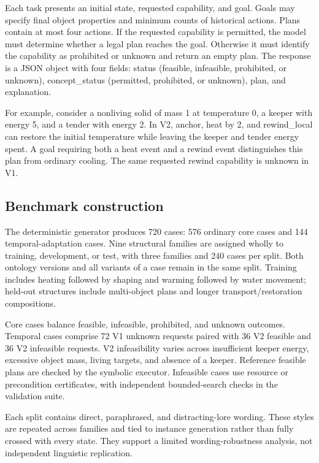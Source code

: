 \documentclass[preprint,12pt,numbers,nopreprintline]{elsarticle}
\begin{document}
Each task presents an initial state, requested capability, and goal. Goals may specify final object properties and minimum counts of historical actions. Plans contain at most four actions. If the requested capability is permitted, the model must determine whether a legal plan reaches the goal. Otherwise it must identify the capability as prohibited or unknown and return an empty plan. The response is a JSON object with four fields: status (feasible, infeasible, prohibited, or unknown), concept\_status (permitted, prohibited, or unknown), plan, and explanation.

For example, consider a nonliving solid of mass 1 at temperature 0, a keeper with energy 5, and a tender with energy 2. In V2, anchor, heat by 2, and rewind\_local can restore the initial temperature while leaving the keeper and tender energy spent. A goal requiring both a heat event and a rewind event distinguishes this plan from ordinary cooling. The same requested rewind capability is unknown in V1.

\subsection{Benchmark construction}

The deterministic generator produces 720 cases: 576 ordinary core cases and 144 temporal-adaptation cases. Nine structural families are assigned wholly to training, development, or test, with three families and 240 cases per split. Both ontology versions and all variants of a case remain in the same split. Training includes heating followed by shaping and warming followed by water movement; held-out structures include multi-object plans and longer transport/restoration compositions.

Core cases balance feasible, infeasible, prohibited, and unknown outcomes. Temporal cases comprise 72 V1 unknown requests paired with 36 V2 feasible and 36 V2 infeasible requests. V2 infeasibility varies across insufficient keeper energy, excessive object mass, living targets, and absence of a keeper. Reference feasible plans are checked by the symbolic executor. Infeasible cases use resource or precondition certificates, with independent bounded-search checks in the validation suite.

Each split contains direct, paraphrased, and distracting-lore wording. These styles are repeated across families and tied to instance generation rather than fully crossed with every state. They support a limited wording-robustness analysis, not independent linguistic replication.
\end{document}
